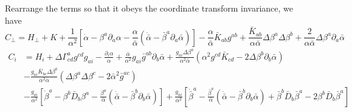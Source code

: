 \documentclass{article}
\begin{document}
Rearrange the terms so that it obeys the coordinate transform invariance, we have
\[
C_{\perp} = H_{\perp} + K + \frac{1}{\alpha^2}[{\dot \alpha} - \beta^{a}\partial_{a}\alpha - \frac{\alpha}{{\bar \alpha}}({\dot{\bar\alpha}}- {\bar\beta}^{a}\partial_{a}{\bar \alpha})] - \frac{\alpha}{{\bar \alpha}}{\bar K}_{ab}g^{ab} + \frac{{\bar K}_{ab}}{\alpha{\bar \alpha}}\Delta \beta^{a} \Delta \beta^{b} + \frac{2}{\alpha {\bar \alpha}}\Delta \beta^{a} \partial_{a}{\bar \alpha}
\]
\begin{align*}
C_{i} & = H_{i} + \Delta \Gamma^{a}_{cd}g^{cd}g_{ai} - \frac{\partial_{i}\alpha}{\alpha} + \frac{{\bar \alpha}}{\alpha^2}g_{ai}{\bar g}^{ab}\partial_{b}{\bar \alpha} + \frac{g_{ai}\Delta \beta^{a}}{\alpha^2 {\bar \alpha}}(\alpha^2g^{cd}{\bar K}_{cd} - 2\Delta\beta^{b}\partial_{b}{\bar \alpha})\\
& - \frac{g_{ai}{\bar K}_{bc}\Delta \beta^{b}}{\alpha^2{\bar \alpha}}(\Delta \beta^{a}\Delta \beta^{c} - 2{\bar \alpha}^2{\bar g}^{ac})\\
& - \frac{g_{ai}}{\alpha^2}[{\dot \beta}^{a} - \beta^{b}{\bar D}_{b}\beta^{a} - \frac{\beta^{a}}{{\bar \alpha}}({\dot {\bar \alpha}} - {\bar \beta}^{b}\partial_{b}{\bar \alpha})] + \frac{g_{ai}}{\alpha^2}[{\dot {\bar \beta}}^{a} -\frac{{\bar \beta}^{a}}{{\bar \alpha}}({\dot {\bar \alpha}} - {\bar \beta}^{b}\partial_{b}{\bar \alpha}) + {\bar \beta}^{b}{\bar D}_{b}{\bar \beta}^{a} - 2\beta^{b}{\bar D}_{b}{\bar \beta}^{a}]
\end{align*}
\end{document}
